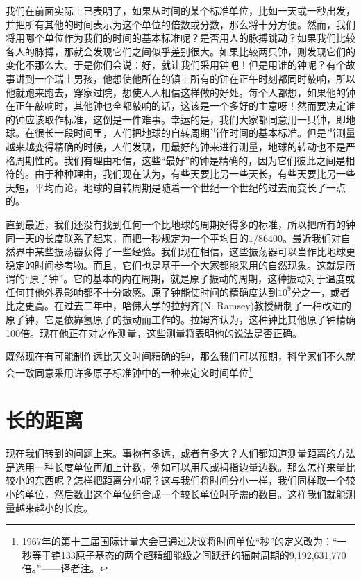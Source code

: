 我们在前面实际上已表明了，如果从时间的某个标准单位，比如一天或一秒出发，并把所有其他的时间表示为这个单位的倍数或分数，那么将十分方便。然而，我们将用哪个单位作为我们的时间的基本标准呢？是否用人的脉搏跳动？如果我们比较各人的脉搏，那就会发现它们之间似乎差别很大。如果比较两只钟，则发现它们的变化不那么大。于是你们会说：好，就让我们采用钟吧！但是用谁的钟呢？有个故事讲到一个瑞士男孩，他想使他所在的镇上所有的钟在正午时刻都同时敲响，所以他就跑来跑去，穿家过院，想使人人相信这样做的好处。每个人都想，如果他的钟在正午敲响时，其他钟也全都敲响的话，这该是一个多好的主意呀！然而要决定谁的钟应该取作标准，这倒是一件难事。幸运的是，我们大家都同意用一只钟，即地球。在很长一段时间里，人们把地球的自转周期当作时间的基本标准。但是当测量越来越变得精确的时候，人们发现，用最好的钟来进行测量，地球的转动也不是严格周期性的。我们有理由相信，这些“最好”的钟是精确的，因为它们彼此之间是相符的。由于种种理由，我们现在认为，有些天要比另一些天长，有些天要比另一些天短，平均而论，地球的自转周期是随着一个世纪一个世纪的过去而变长了一点的。

直到最近，我们还没有找到任何一个比地球的周期好得多的标准，所以把所有的钟同一天的长度联系了起来，而把一秒规定为一个平均日的$  1/86400$。最近我们对自然界中某些振荡器获得了一些经验。我们现在相信，这些振荡器可以当作比地球更稳定的时间参考物。而且，它们也是基于一个大家都能采用的自然现象。这就是所谓的“原子钟”。它的基本的内在周期，就是原子振动的周期，这种振动对于温度或任何其他外界影响都不十分敏感。原子钟能使时间的精确度达到$ 10^9 $分之一，或者比之更高。在过去二年中，哈佛大学的拉姆齐(N. Ramsey)教授研制了一种改进的原子钟，它是依靠氢原子的振动而工作的。拉姆齐认为，这种钟比其他原子钟精确100倍。现在他正在对之作测量，这些测量将表明他的说法是否正确。

既然现在有可能制作远比天文时间精确的钟，那么我们可以预期，科学家们不久就会一致同意采用许多原子标准钟中的一种来定义时间单位\footnote{1967年的第十三届国际计量大会已通过决议将时间单位“秒”的定义改为：“一秒等于铯133原子基态的两个超精细能级之间跃迁的辐射周期的9,192,631,770倍。”——译者注。}



\section{长的距离}
现在我们转到的问题上来。事物有多远，或者有多大？人们都知道测量距离的方法是选用一种长度单位再加上计数，例如可以用尺或拇指边量边数。那么怎样来量比较小的东西呢？怎样把距离分小呢？这与我们将时间分小一样，我们同样取一个较小的单位，然后数出这个单位组合成一个较长单位时所需的数目。这样我们就能测量越来越小的长度。


